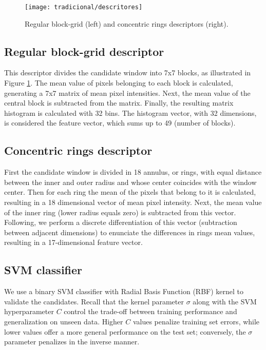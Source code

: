     \begin{figure}
    \centering
    \texttt{[image: tradicional/descritores]}
    \caption{Regular block-grid (left) and concentric rings descriptors (right).}
    \label{fig:descriptors}
    \end{figure}

    \subsection{Regular block-grid descriptor}
      This descriptor divides the candidate window into 7x7 blocks, as illustrated in Figure \ref{fig:descriptors}. The mean value of pixels belonging to each block is calculated, generating a 7x7 matrix of mean pixel intensities. Next, the mean value of the central block is subtracted from the matrix. Finally, the resulting matrix histogram is calculated with 32 bins. The histogram vector, with 32 dimensions, is considered the feature vector, which sums up to 49 (number of blocks).

    \subsection{Concentric rings descriptor}
       First the candidate window is divided in 18 annulus, or rings, with equal distance between the inner and outer radius and whose center coincides with the window center. Then for each ring the mean of the pixels that belong to it is calculated, resulting in a 18 dimensional vector of mean pixel intensity. Next, the mean value of the inner ring (lower radius equals zero) is subtracted from this vector. Following, we perform a discrete differentiation of this vector (subtraction between adjacent dimensions) to enunciate the differences in rings mean values, resulting in a 17-dimensional feature vector.

    \subsection{SVM classifier}
      We use a binary SVM classifier with Radial Basis Function (RBF) kernel \cite{rbfkernel} to validate the candidates. Recall that the kernel parameter $\sigma$ along with the SVM hyperparameter $C$ control the trade-off between training performance and generalization on unseen data. Higher $C$ values penalize training set errors, while lower values offer a more general performance on the test set; conversely, the $\sigma$ parameter penalizes in the inverse manner.

